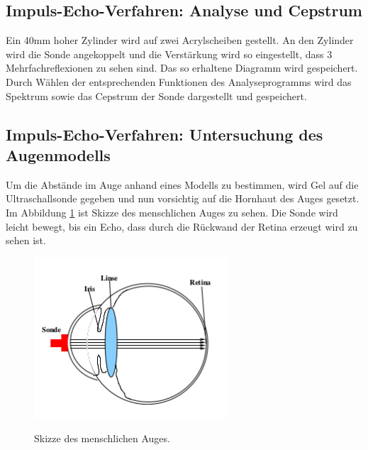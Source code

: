 \subsection{Impuls-Echo-Verfahren: Analyse und Cepstrum}
Ein 40\;mm hoher Zylinder wird auf zwei Acrylscheiben gestellt. An den
Zylinder wird die Sonde angekoppelt und die Verstärkung wird so eingestellt, dass
3 Mehrfachreflexionen zu sehen sind. Das so erhaltene Diagramm wird
gespeichert. Durch Wählen der entsprechenden Funktionen des
Analyseprogramms wird das Spektrum sowie das Cepstrum der Sonde dargestellt
und gespeichert.

\subsection{Impuls-Echo-Verfahren: Untersuchung des Augenmodells}
Um die Abstände im Auge anhand eines Modells zu bestimmen, wird Gel auf die
Ultraschallsonde gegeben und nun vorsichtig auf die Hornhaut des
Auges gesetzt. Im Abbildung \ref{fig:auge} ist Skizze des menschlichen
Auges zu sehen. Die Sonde wird leicht bewegt, bis ein Echo, dass durch
die Rückwand der Retina erzeugt wird zu sehen ist.

\begin{figure}[H]
  \centering
  \includegraphics[height=6cm]{auge.png}
  \caption{Skizze des menschlichen Auges.}
  \label{fig:auge}
  \cite{skript}
\end{figure}
